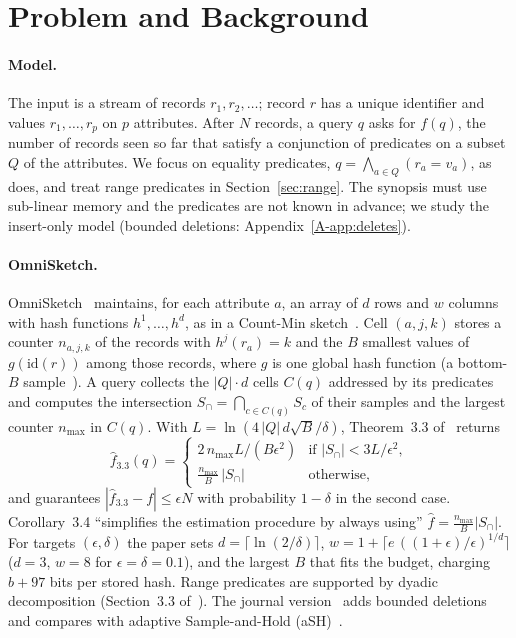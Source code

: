 \documentclass[sigconf]{acmart}
\newcommand{\omni}{OmniSketch\xspace}
\newcommand{\apx}[1]{Appendix~\ref{A-#1}}
\begin{document}
\section{Problem and Background}\label{sec:background}

\paragraph{Model.} The input is a stream of records $r_1, r_2, \dots$; record $r$ has a unique
identifier and values $r_1,\dots,r_p$ on $p$ attributes. After $N$ records, a query $q$ asks for $f(q)$,
the number of records seen so far that satisfy a conjunction of predicates on a subset $Q$ of the
attributes. We focus on equality predicates, $q = \bigwedge_{a\in Q}(r_a = v_a)$, as~\cite{omni} does,
and treat range predicates in Section~\ref{sec:range}. The synopsis must use sub-linear memory and the
predicates are not known in advance; we study the insert-only model (bounded deletions:
\apx{app:deletes}).

\paragraph{\omni.} \omni~\cite{omni} maintains, for each attribute $a$, an array of $d$ rows and $w$
columns with hash functions $h^1,\dots,h^d$, as in a Count-Min sketch~\cite{cm}. Cell $(a,j,k)$ stores
a counter $n_{a,j,k}$ of the records with $h^j(r_a)=k$ and the $B$ smallest values of
$g(\mathrm{id}(r))$ among those records, where $g$ is one global hash function (a bottom-$B$
sample~\cite{pagh}). A query collects the $|Q|\cdot d$ cells $C(q)$ addressed by its predicates and
computes the intersection $S_\cap=\bigcap_{c\in C(q)} S_c$ of their samples and the largest counter
$n_{\max}$ in $C(q)$. With $L=\ln(4\,|Q|\,d\sqrt B/\delta)$, Theorem~3.3 of~\cite{omni} returns
\begin{equation}\label{eq:thm33}
  \hat f_{3.3}(q)=\begin{cases}
     2\,n_{\max}L/(B\epsilon^2) & \text{if } |S_\cap| < 3L/\epsilon^2,\\[2pt]
     \frac{n_{\max}}{B}\,|S_\cap| & \text{otherwise,}
  \end{cases}
\end{equation}
and guarantees $|\hat f_{3.3}-f|\le\epsilon N$ with probability $1-\delta$ in the second case.
Corollary~3.4 ``simplifies the estimation procedure by always using'' $\hat f=\frac{n_{\max}}{B}|S_\cap|$.
For targets $(\epsilon,\delta)$ the paper sets $d=\lceil\ln(2/\delta)\rceil$,
$w = 1+\lceil e\,((1+\epsilon)/\epsilon)^{1/d}\rceil$ ($d=3$, $w=8$ for $\epsilon=\delta=0.1$), and the
largest $B$ that fits the budget, charging $b+97$ bits per stored hash. Range predicates are supported by
dyadic decomposition (Section~3.3 of~\cite{omni}). The journal version~\cite{omni-vldbj} adds bounded
deletions and compares with adaptive Sample-and-Hold (aSH)~\cite{ash}.
\end{document}
